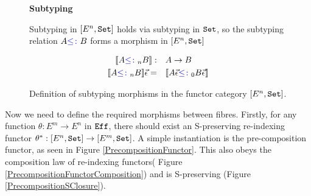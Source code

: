 \begin{figure}
    \begin{framed}
        
\centering\textbf{Subtyping}


Subtyping in $[E^n, \texttt{Set}]$ holds via subtyping in $\texttt{Set}$, so the subtyping relation $A {\color{blue} \leq\colon} B$ forms a morphism in $[E^n, \texttt{Set}]$

\begin{align*}
    {\bf [\![}A{\color{blue} \leq\colon}_n B{\bf ]\!]}:&\quad A\rightarrow B\\
    {\bf [\![}A{\color{blue} \leq\colon}_n B{\bf ]\!]}\vec{\epsilon}=&\quad {\bf [\![}A\vec{\epsilon}{\color{blue} \leq\colon}_0 B\vec{\epsilon}{\bf ]\!]}
\end{align*}



    \end{framed}
    \caption{Definition of subtyping morphisms in the functor category $[E^n, \texttt{Set}]$.}
    \label{HowToBuildSubtyping}
\end{figure}

Now we need to define the required morphisms between fibres. Firstly, for any function $\theta: E^m \rightarrow E^n$ in $\texttt{Eff}$, there should exist an S-preserving re-indexing functor $\theta^*: [E^n, \texttt{Set}] \rightarrow [E^m, \texttt{Set}]$. A simple instantiation is the pre-composition functor, as seen in Figure \ref{PrecompositionFunctor}. This also obeys the composition law of re-indexing functors( Figure \ref{PrecompositionFunctorComposition}) and is S-preserving (Figure \ref{PrecompositionSClosure}).


